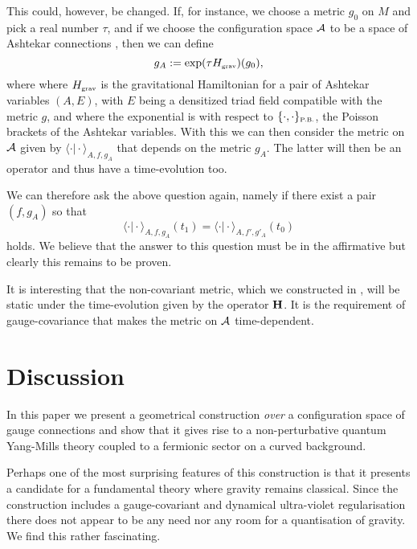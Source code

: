 \documentclass[12pt]{article}
\def\ca{{\cal A}}
\begin{document}
This could, however, be changed. If, for instance, we choose a metric $g_0$ on $M$ and pick a real number $\tau$, and if we choose the configuration space $\ca$ to be a space of Ashtekar connections \cite{Ashtekar:1986yd,Ashtekar:1987gu}, then we can define
\begin{equation}
g_A := \exp(\tau H_{\mbox{\tiny grav}}) (g_0),
\label{metric-time}
\end{equation}
where where $H_{\mbox{\tiny grav}}$ is the gravitational Hamiltonian for a pair of Ashtekar variables $(A,E)$, with $E$ being a densitized triad field compatible with the metric $g$, and where the exponential is with respect to $\{\cdot ,\cdot \}_{\mbox{\tiny P.B.}}$, the Poisson brackets of the Ashtekar variables. With this we can then consider the metric on $\ca$ given by
$\langle \cdot \vert \cdot\rangle_{A,f,g_A}$ that depends on the metric $g_A$. The latter will then be an operator and thus have a time-evolution too.

We can therefore ask the above question again, namely if there exist a pair $(f,g_A)$ so that
$$
\langle \cdot \vert \cdot\rangle_{A,f,g_A} (t_1) = \langle \cdot \vert \cdot\rangle_{A,f',g'_A} (t_0)
$$
holds.
We believe that the answer to this question must be in the affirmative but clearly this remains to be proven. 

It is interesting that the non-covariant metric, which we constructed in \cite{Aastrup:2017vrm}, will be static under the time-evolution given by the operator ${\bf H}$. It is the requirement of gauge-covariance that makes the metric on $\ca$ time-dependent.





\section{Discussion}
\label{secdiscussion}



 In this paper we present a geometrical construction {\it over} a configuration space of gauge connections and show that it gives rise to a non-perturbative quantum Yang-Mills theory coupled to a fermionic sector on a curved background.
 
Perhaps one of the most surprising features of this construction is that it presents a candidate for a fundamental theory where gravity remains classical. Since the construction includes a gauge-covariant and dynamical ultra-violet regularisation there does not appear to be any need nor any room for a quantisation of gravity. We find this rather fascinating.\\
 
\end{document}
